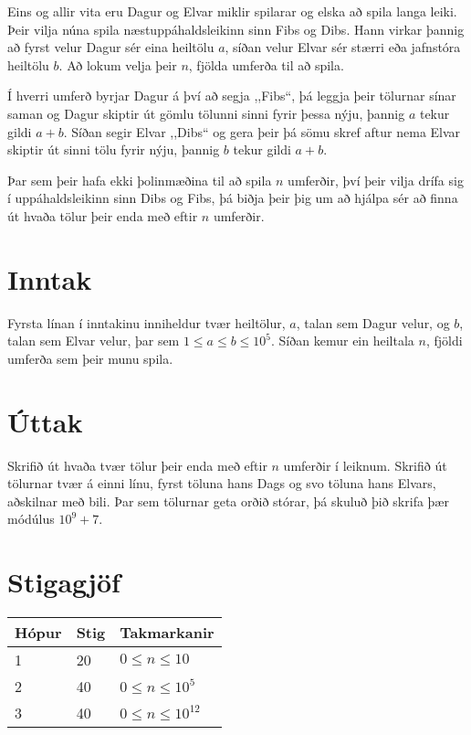 Eins og allir vita eru Dagur og Elvar miklir spilarar og elska að spila langa leiki.
Þeir vilja núna spila næstuppáhaldsleikinn sinn Fibs og Dibs.
Hann virkar þannig að fyrst velur Dagur sér eina heiltölu $a$, síðan velur Elvar sér stærri eða jafnstóra heiltölu $b$.
Að lokum velja þeir $n$, fjölda umferða til að spila.

Í hverri umferð byrjar Dagur á því að segja ,,Fibs``,
þá leggja þeir tölurnar sínar saman og Dagur skiptir út gömlu tölunni sinni fyrir þessa nýju, þannig $a$ tekur gildi $a + b$.
Síðan segir Elvar ,,Dibs`` og gera þeir þá sömu skref aftur nema Elvar skiptir út sinni tölu fyrir nýju, þannig $b$ tekur gildi $a + b$.

Þar sem þeir hafa ekki þolinmæðina til að spila $n$ umferðir, því þeir vilja drífa sig í uppáhaldsleikinn sinn Dibs og Fibs,
þá biðja þeir þig um að hjálpa sér að finna út hvaða tölur þeir enda með eftir $n$ umferðir.

\section*{Inntak}
Fyrsta línan í inntakinu inniheldur tvær heiltölur, $a$, talan sem Dagur velur, og $b$,
talan sem Elvar velur, þar sem $1 \leq a \leq b \leq 10^5$.
Síðan kemur ein heiltala $n$, fjöldi umferða sem þeir munu spila.

\section*{Úttak}
Skrifið út hvaða tvær tölur þeir enda með eftir $n$ umferðir í leiknum.
Skrifið út tölurnar tvær á einni línu, fyrst töluna hans Dags og svo töluna hans Elvars, aðskilnar með bili.
Þar sem tölurnar geta orðið stórar, þá skuluð þið skrifa þær módúlus $10^9 + 7$.

\section*{Stigagjöf}
\begin{tabular}{|l|l|l|}
\hline
Hópur & Stig & Takmarkanir \\ \hline
1     & 20   & $0 \leq n \leq 10$ \\ \hline
2     & 40   & $0 \leq n \leq 10^5$ \\ \hline
3     & 40   & $0 \leq n \leq 10^{12}$ \\ \hline
\end{tabular}

